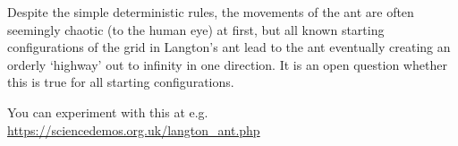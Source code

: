 \documentclass{article}
\theoremstyle{plain}
\theoremstyle{definition}
\begin{document}
Despite the simple deterministic rules, the movements of the ant are often seemingly chaotic (to the human eye) at first, but all known starting configurations of the grid in Langton's ant lead to the ant eventually creating an orderly `highway' out to infinity in one direction. It is an open question whether this is true for all starting configurations. 

You can experiment with this at e.g. \url{https://sciencedemos.org.uk/langton_ant.php}
\end{document}

